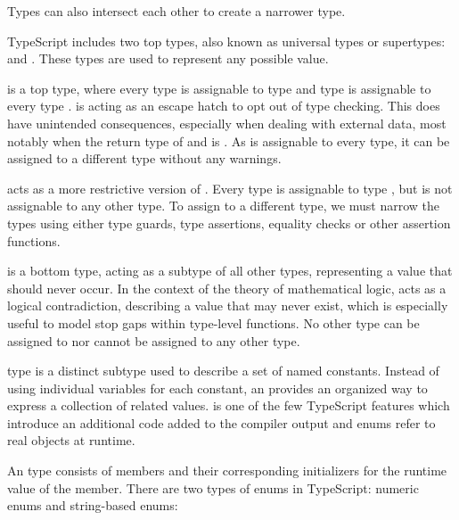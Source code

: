 Types can also intersect each other to create a narrower type.


TypeScript includes two top types, also known as universal types or supertypes:  and . These types are used to represent any possible value.

 is a top type, where every type is assignable to type  and type  is assignable to every type \cite{TopTypesAny}.  is acting as an escape hatch to opt out of type checking. This does have unintended consequences, especially when dealing with external data, most notably when the return type of  and  is . As  is assignable to every type, it can be assigned to a different type without any warnings.


 acts as a more restrictive version of . Every type is assignable to type , but  is not assignable to any other type. To assign  to a different type, we must narrow the types using either type guards, type assertions, equality checks or other assertion functions.


 is a bottom type, acting as a subtype of all other types, representing a value that should never occur. In the context of the theory of mathematical logic,  acts as a logical contradiction, describing a value that may never exist, which is especially useful to model stop gaps within type-level functions. No other type can be assigned to  nor  cannot be assigned to any other type.


 type is a distinct subtype used to describe a set of named constants. Instead of using individual variables for each constant, an  provides an organized way to express a collection of related values.  is one of the few TypeScript features which introduce an additional code added to the compiler output and enums refer to real objects at runtime.

An  type consists of members and their corresponding initializers for the runtime value of the member. There are two types of enums in TypeScript: numeric enums and string-based enums:

